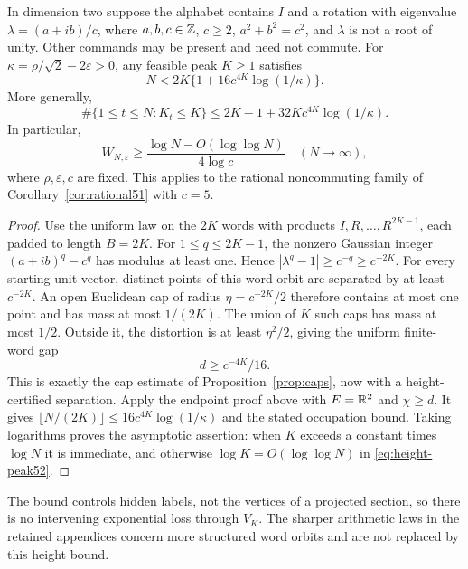 \begin{theorem}\label{thm:height52}
In dimension two suppose the alphabet contains $I$ and a rotation
with eigenvalue $\lambda=(a+ib)/c$, where $a,b,c\in\mathbb Z$, $c\ge2$,
$a^2+b^2=c^2$, and $\lambda$ is not a root of unity. Other commands
may be present and need not commute. For
$\kappa=\rho/\sqrt2-2\varepsilon>0$, any feasible peak $K\ge1$
satisfies
\begin{equation}\label{eq:height-peak52}
 N<2K\{1+16c^{4K}\log(1/\kappa)\}.
\end{equation}
More generally,
\begin{equation}\label{eq:height-occupation52}
 \#\{1\le t\le N:K_t\le K\}
       \le2K-1+32Kc^{4K}\log(1/\kappa).
\end{equation}
In particular,
\[
 W_{N,\varepsilon}\ge
       \frac{\log N-O(\log\log N)}{4\log c}
       \quad(N\to\infty),
\]
where $\rho,\varepsilon,c$ are fixed. This applies to the rational
noncommuting family of Corollary~\ref{cor:rational51} with $c=5$.
\end{theorem}
\begin{proof}
Use the uniform law on the $2K$ words with products
$I,R,\ldots,R^{2K-1}$, each padded to length $B=2K$.
For $1\le q\le2K-1$, the nonzero Gaussian integer
$(a+ib)^q-c^q$ has modulus at least one. Hence
$|\lambda^q-1|\ge c^{-q}\ge c^{-2K}$.
For every starting unit vector, distinct points of this word orbit
are separated by at least $c^{-2K}$. An open Euclidean cap of radius
$\eta=c^{-2K}/2$ therefore contains at most one point and has mass
at most $1/(2K)$. The union of $K$ such caps has mass at most $1/2$.
Outside it, the distortion is at least $\eta^2/2$, giving the
uniform finite-word gap
\[
                         d\ge c^{-4K}/16.
\]
This is exactly the cap estimate of Proposition~\ref{prop:caps},
now with a height-certified separation. Apply the endpoint proof
above with $E=\mathbb R^2$ and $\chi\ge d$. It gives
$\lfloor N/(2K)\rfloor\le16c^{4K}\log(1/\kappa)$ and the stated
occupation bound. Taking logarithms proves the asymptotic assertion:
when $K$ exceeds a constant times $\log N$ it is immediate, and
otherwise $\log K=O(\log\log N)$ in \eqref{eq:height-peak52}.
\end{proof}

The bound controls hidden labels, not the vertices of a projected
section, so there is no intervening exponential loss through $V_K$.
The sharper arithmetic laws in the retained appendices concern more
structured word orbits and are not replaced by this height bound.
